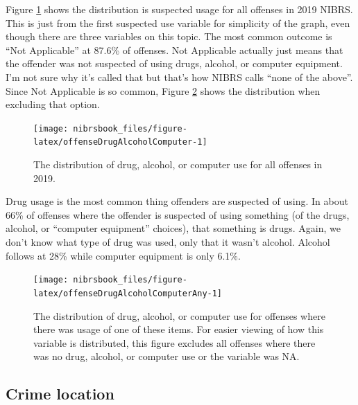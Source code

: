 \documentclass[
  12pt,
  openany]{book}
\begin{document}
Figure \ref{fig:offenseDrugAlcoholComputer} shows the distribution is suspected usage for all offenses in 2019 NIBRS. This is just from the first suspected use variable for simplicity of the graph, even though there are three variables on this topic. The most common outcome is ``Not Applicable'' at 87.6\% of offenses. Not Applicable actually just means that the offender was not suspected of using drugs, alcohol, or computer equipment. I'm not sure why it's called that but that's how NIBRS calls ``none of the above''. Since Not Applicable is so common, Figure \ref{fig:offenseDrugAlcoholComputerAny} shows the distribution when excluding that option.

\begin{figure}

{\centering \texttt{[image: nibrsbook\_files/figure-latex/offenseDrugAlcoholComputer-1]} 

}

\caption{The distribution of drug, alcohol, or computer use for all offenses in 2019.}\label{fig:offenseDrugAlcoholComputer}
\end{figure}

Drug usage is the most common thing offenders are suspected of using. In about 66\% of offenses where the offender is suspected of using something (of the drugs, alcohol, or ``computer equipment'' choices), that something is drugs. Again, we don't know what type of drug was used, only that it wasn't alcohol. Alcohol follows at 28\% while computer equipment is only 6.1\%.

\begin{figure}

{\centering \texttt{[image: nibrsbook\_files/figure-latex/offenseDrugAlcoholComputerAny-1]} 

}

\caption{The distribution of drug, alcohol, or computer use for offenses where there was usage of one of these items. For easier viewing of how this variable is distributed, this figure excludes all offenses where there was no drug, alcohol, or computer use or the variable was NA.}\label{fig:offenseDrugAlcoholComputerAny}
\end{figure}

\hypertarget{crime-location}{%
\subsection{Crime location}\label{crime-location}}
\end{document}
